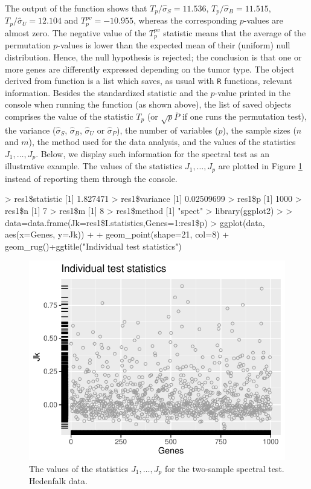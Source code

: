 The output of the function  shows that $T_p/\widehat{\sigma}_S=11.536$, $T_p/\widehat{\sigma}_B=11.515$, $T_p/\widehat{\sigma}_U=12.104$ and
$T_p^{pv}=-10.955$, whereas the
corresponding $p$-values are almost zero. The negative value of the $T_p^{pv}$ statistic means that the average of the permutation $p$-values is lower than the expected mean of their (uniform) null distribution. Hence, the null hypothesis is rejected; the conclusion is that one or
more genes are differently expressed depending on the tumor type. The object derived from  function is a list which saves, as usual with \texttt{R} functions, relevant information. Besides the standardized statistic and the $p$-value printed in the console when running the function (as shown above), the list of saved objects comprises
the value of the statistic $T_p$ (or $\sqrt{p}\bar 
P$ if one runs the permutation test), the variance ($\widehat{\sigma}_S$, $\widehat{\sigma}_B$, $\widehat{\sigma}_U$ or $\widehat{\sigma}_{P}$), the number of variables ($p$), the sample sizes ($n$ and $m$), the method used
for the data analysis, and the values of the statistics $J_1, \dots, J_p$. 
Below, we display such information for the spectral test as an illustrative example. The values of the statistics  $J_1, \dots, J_p$ are plotted in Figure \ref{fig:1} instead  of reporting them through the console. 

\begin{example}
	> res1\$statistic
	[1] 1.827471
	> res1\$variance
	[1] 0.02509699
	> res1\$p
	[1] 1000
	> res1\$n
	[1] 7
	> res1\$m
	[1] 8
	> res1\$method
	[1] "spect"
	> library(ggplot2)
	> 
	> data=data.frame(Jk=res1\$I.statistics,Genes=1:res1\$p)
	> ggplot(data, aes(x=Genes, y=Jk)) +
	+   geom_point(shape=21, col=8) + geom_rug()+ggtitle("Individual test statistics")
\end{example}




\begin{figure}[htb]
	\centering
	\includegraphics[width=1\textwidth]{ima1.pdf}
	\caption{The values of the statistics $J_1, \dots, J_p$ for the two-sample spectral test. Hedenfalk data.}
	\label{fig:1}
\end{figure}



